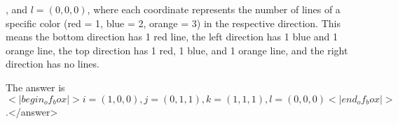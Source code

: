 \), and \( l = (0, 0, 0) \), where each coordinate represents the number of lines of a specific color (red = 1, blue = 2, orange = 3) in the respective direction. This means the bottom direction has 1 red line, the left direction has 1 blue and 1 orange line, the top direction has 1 red, 1 blue, and 1 orange line, and the right direction has no lines.  

The answer is \(<|begin_of_box|>i = (1, 0, 0), j = (0, 1, 1), k = (1, 1, 1), l = (0, 0, 0)<|end_of_box|>\).</answer>